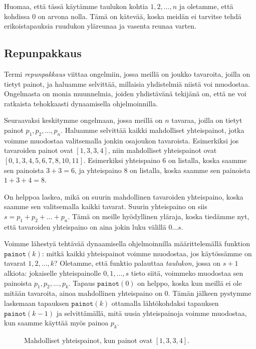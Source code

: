 Huomaa, että tässä käytämme taulukon kohtia $1,2,\dots,n$
ja oletamme, että kohdissa $0$ on arvona nolla.
Tämä on kätevää, koska meidän ei tarvitse tehdä erikoistapauksia
ruudukon yläreunaa ja vasenta reunaa varten.

\subsection{Repunpakkaus}


Termi \emph{repunpakkaus} viittaa ongelmiin, jossa meillä on joukko
tavaroita, joilla on tietyt painot, 
ja haluamme selvittää, millaisia yhdistelmiä niistä voi muodostaa.
Ongelmasta on monia muunnelmia, joiden yhdistävänä tekijänä on,
että ne voi ratkaista tehokkaasti dynaamisella ohjelmoinnilla.

Seuraavaksi keskitymme ongelmaan, jossa meillä on $n$ tavaraa,
joilla on tietyt painot $p_1,p_2,\dots,p_n$.
Haluamme selvittää kaikki mahdolliset yhteispainot,
jotka voimme muodostaa valitsemalla jonkin osajoukon tavaroista.
Esimerkiksi jos tavaroiden painot ovat $[1,3,3,4]$,
niin mahdolliset yhteispainot ovat $[0,1,3,4,5,6,7,8,10,11]$.
Esimerkiksi yhteispaino $6$ on listalla,
koska saamme sen painoista $3+3=6$,
ja yhteispaino $8$ on listalla,
koska saamme sen painoista $1+3+4=8$.

On helppoa laskea, mikä on suurin mahdollinen tavaroiden yhteispaino,
koska saamme sen valitsemalla kaikki tavarat.
Suurin yhteispaino on siis $s=p_1+p_2+\dots+p_n$.
Tämä on meille hyödyllinen yläraja, koska tiedämme nyt,
että tavaroiden yhteispaino on aina jokin luku välillä $0 \dots s$.

Voimme lähestyä tehtävää dynaamisella ohjelmoinnilla määrittelemällä
funktion $\texttt{painot}(k)$: mitkä kaikki yhteispainot voimme
muodostaa, jos käytös\-sämme on tavarat $1,2,\dots,k$?
Oletamme, että funktio palauttaa \emph{taulukon}, jossa on $s+1$ alkiota:
jokaiselle yhteispainolle $0,1,\dots,s$ tieto siitä,
voimmeko muodostaa sen painoista $p_1,p_2,\dots,p_k$.
Tapaus $\texttt{painot}(0)$ on helppo,
koska kun meillä ei ole mitään tavaroita,
ainoa mahdollinen yhteispaino on $0$.
Tämän jälkeen pystymme laskemaan tapauksen $\texttt{painot}(k)$
ottamalla lähtökohdaksi tapauksen $\texttt{painot}(k-1)$
ja selvittämällä, mitä uusia yhteispainoja voimme muodostaa,
kun saamme käyttää myös painoa $p_k$.

\begin{figure}
\center
{}
\caption{Mahdolliset yhteispainot, kun painot ovat $[1,3,3,4]$.}
\label{fig:reppak}
\end{figure}

